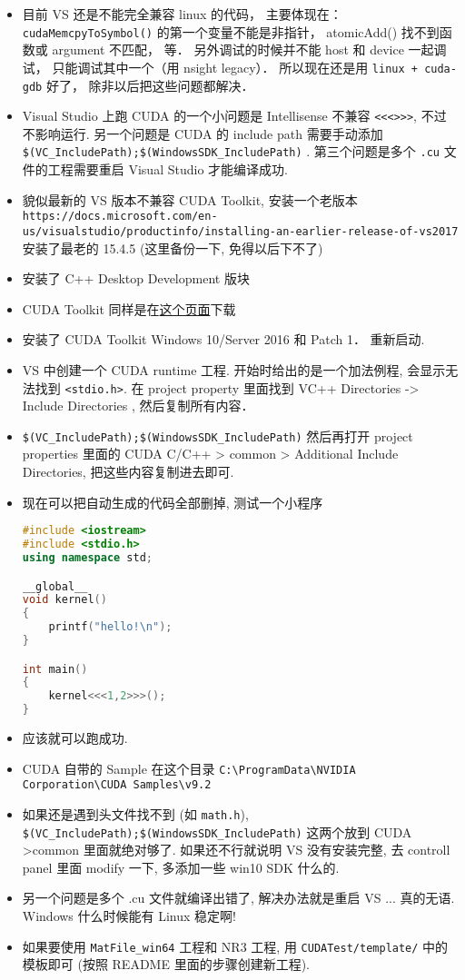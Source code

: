 
\begin{itemize}
\item 目前 VS 还是不能完全兼容 linux 的代码， 主要体现在： \verb|cudaMemcpyToSymbol()| 的第一个变量不能是非指针， atomicAdd() 找不到函数或 argument 不匹配， 等． 另外调试的时候并不能 host 和 device 一起调试， 只能调试其中一个（用 nsight legacy）． 所以现在还是用 \verb|linux + cuda-gdb| 好了， 除非以后把这些问题都解决．
\item Visual Studio 上跑 CUDA 的一个小问题是 Intellisense 不兼容 \verb`<<<>>>`, 不过不影响运行. 另一个问题是 CUDA 的 include path 需要手动添加 \verb`$(VC_IncludePath);$(WindowsSDK_IncludePath)` . 第三个问题是多个 \verb`.cu` 文件的工程需要重启 Visual Studio 才能编译成功.
\item 貌似最新的 VS 版本不兼容 CUDA Toolkit, 安装一个老版本 \verb|https://docs.microsoft.com/en-us/visualstudio/productinfo/installing-an-earlier-release-of-vs2017| 安装了最老的 15.4.5 (这里备份一下, 免得以后下不了)
\item 安装了 C++ Desktop Development 版块
\item CUDA Toolkit 同样是在\href{https://developer.nvidia.com/cuda-downloads}{这个页面}下载
\item 安装了 CUDA Toolkit Windows 10/Server 2016 和 Patch 1． 重新启动.
\item VS 中创建一个 CUDA runtime 工程. 开始时给出的是一个加法例程, 会显示无法找到 \verb`<stdio.h>`. 在 project property 里面找到 VC++ Directories -> Include Directories , 然后复制所有内容．
\item \verb|$(VC_IncludePath);$(WindowsSDK_IncludePath)| 然后再打开 project properties 里面的 CUDA C/C++ >  common > Additional Include Directories, 把这些内容复制进去即可.
\item 现在可以把自动生成的代码全部删掉, 测试一个小程序
\begin{lstlisting}[language=cpp]
#include <iostream>
#include <stdio.h>
using namespace std;

__global__
void kernel()
{
	printf("hello!\n");
}

int main()
{
	kernel<<<1,2>>>();
}
\end{lstlisting}
\item 应该就可以跑成功.
\item CUDA 自带的 Sample 在这个目录 \verb|C:\ProgramData\NVIDIA Corporation\CUDA Samples\v9.2|
\item 如果还是遇到头文件找不到 (如 \verb`math.h`), \verb`$(VC_IncludePath);$(WindowsSDK_IncludePath)` 这两个放到 CUDA >common 里面就绝对够了. 如果还不行就说明 VS 没有安装完整, 去 controll panel 里面 modify 一下, 多添加一些 win10 SDK 什么的.
\item 另一个问题是多个 .cu 文件就编译出错了, 解决办法就是重启 VS ... 真的无语. Windows 什么时候能有 Linux 稳定啊!
\item 如果要使用 \verb|MatFile_win64| 工程和 NR3 工程, 用 \verb|CUDATest/template/| 中的模板即可 (按照 README 里面的步骤创建新工程).
\end{itemize}
